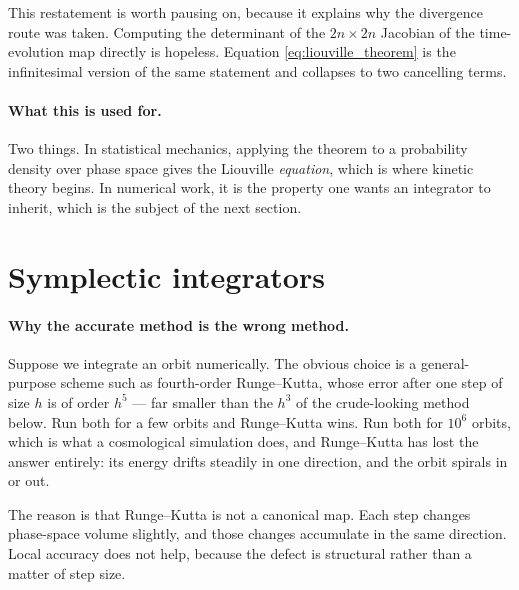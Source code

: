 \documentclass[12pt]{article}
\begin{document}
This restatement is worth pausing on, because it explains why the
divergence route was taken.  Computing the determinant of the
$2n\times2n$ Jacobian of the time-evolution map directly is hopeless.
Equation \eqref{eq:liouville_theorem} is the infinitesimal version of
the same statement and collapses to two cancelling terms.

\paragraph{What this is used for.}  Two things.  In statistical
mechanics, applying the theorem to a probability density over phase
space gives the Liouville \emph{equation}, which is where kinetic
theory begins.  In numerical work, it is the property one wants an
integrator to inherit, which is the subject of the next section.

\section{Symplectic integrators}
\label{sec:symplectic}

\paragraph{Why the accurate method is the wrong method.}  Suppose we
integrate an orbit numerically.  The obvious choice is a
general-purpose scheme such as fourth-order Runge--Kutta, whose error
after one step of size $h$ is of order $h^5$ --- far smaller than the
$h^3$ of the crude-looking method below.  Run both for a few orbits and
Runge--Kutta wins.  Run both for $10^6$ orbits, which is what a
cosmological simulation does, and Runge--Kutta has lost the answer
entirely: its energy drifts steadily in one direction, and the orbit
spirals in or out.

The reason is that Runge--Kutta is not a canonical map.  Each step
changes phase-space volume slightly, and those changes accumulate in
the same direction.  Local accuracy does not help, because the defect
is structural rather than a matter of step size.
\end{document}
